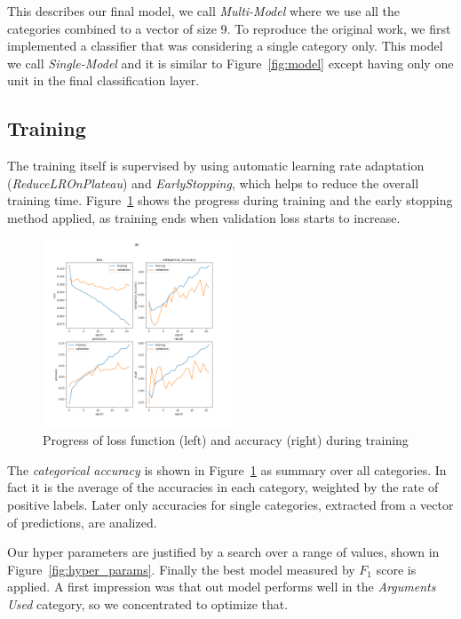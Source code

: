 \documentclass[11pt,a4paper]{article}
\begin{document}
This describes our final model, we call \textit{Multi-Model} where we use all the categories combined to a vector of size 9.
To reproduce the original work, we first implemented a classifier that was considering a single category only. 
This model we call \textit{Single-Model} and it is similar to Figure~\ref{fig:model} except having only one unit in the final classification layer.


\subsection{Training}

The training itself is supervised by using automatic learning rate adaptation (\textit{ReduceLROnPlateau}) and \textit{EarlyStopping}, which helps to reduce the overall training time.
Figure~\ref{fig:training_loss} shows the progress during training and the early stopping method applied, as training ends when validation loss starts to increase.

\begin{figure}[h!]
	\centering
	\includegraphics[trim={1.4cm 12.4cm 2cm 2.5cm},clip,width=0.5\textwidth]{img/training_All_22}
	\caption{Progress of loss function (left) and accuracy (right) during training}
	\label{fig:training_loss}
\end{figure}

The \textit{categorical accuracy} is shown in Figure~\ref{fig:training_loss} as summary over all categories. In fact it is the average of the accuracies in each category, weighted by the rate of positive labels. Later only accuracies for single categories, extracted from a vector of predictions, are analized.

Our hyper parameters are justified by a search over a range of values, shown in Figure~\ref{fig:hyper_params}. Finally the best model measured by $F_1$ score is applied. A first impression was that out model performs well in the \textit{Arguments Used} category, so we concentrated to optimize that.
\end{document}

